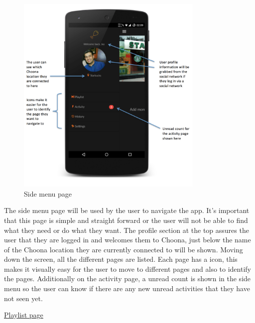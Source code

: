 \noindent
\begin{figure}[h!]
\centering
\includegraphics[width=0.8\textwidth]{./img/sidemenuannotated.png}
\caption{Side menu page}
\label{fig:sidemenu}
\end{figure}

The side menu page will be used by the user to navigate the app. It's important that this page is simple and straight forward or the user will not be able to find what they need or do what they want. The profile section at the top assures the user that they are logged in and welcomes them to Choona, just below the name of the Choona location they are currently connected to will be shown. Moving down the screen, all the different pages are listed. Each page has a icon, this makes it visually easy for the user to move to different pages and also to identify the pages. Additionally on the activity page, a unread count is shown in the side menu so the user can know if there are any new unread activities that they have not seen yet.\\

\newpage

\noindent\underline{Playlist page}\newline

